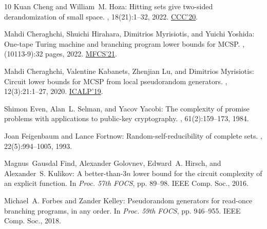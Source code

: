 \documentclass[11pt]{article}
\numberwithin{equation}{section}
\theoremstyle{definition}
\theoremstyle{plain}
\begin{document}
\begin{thebibliography}{10}
{\sc Kuan Cheng and William~M. Hoza}: Hitting sets give two-sided
  derandomization of small space.
, 18(21):1--32, 2022.
\newblock \prelim \href{https://doi.org/10.4230/LIPIcs.CCC.2020.10}{CCC'20}.

{\sc Mahdi Cheraghchi, Shuichi Hirahara, Dimitrios Myrisiotis, and Yuichi
  Yoshida}: One-tape {T}uring machine and branching program lower bounds for
  {MCSP}.
, (10113-9):32 pages, 2022.
\newblock \prelim \href{https://doi.org/10.4230/LIPIcs.STACS.2021.23}{MFCS'21}.
\newblock [\epfmtdoi{10.1007/s00224-022-10113-9}]

{\sc Mahdi Cheraghchi, Valentine Kabanets, Zhenjian Lu, and Dimitrios
  Myrisiotis}: Circuit lower bounds for {MCSP} from local pseudorandom
  generators.
, 12(3):21:1--27, 2020.
\newblock \prelim
  \href{https://doi.org/10.4230/LIPIcs.ICALP.2019.39}{ICALP'19}.
\newblock [\epfmtdoi{10.1145/3404860}]

{\sc Shimon Even, Alan~L. Selman, and Yacov Yacobi}: The complexity of promise
  problems with applications to public-key cryptography.
, 61(2):159--173, 1984.
\newblock [\epfmtdoi{10.1016/S0019-9958(84)80056-X}]

{\sc Joan Feigenbaum and Lance Fortnow}: Random-self-reducibility of complete
  sets.
, 22(5):994--1005, 1993.
\newblock [\epfmtdoi{10.1137/0222061}]

{\sc Magnus~Gausdal Find, Alexander Golovnev, Edward~A. Hirsch, and
  Alexander~S. Kulikov}: A better-than-$3n$ lower bound for the circuit
  complexity of an explicit function.
\newblock In {\em Proc. 57th FOCS}, pp. 89--98. IEEE Comp. Soc., 2016.

{\sc Michael~A. Forbes and Zander Kelley}: Pseudorandom generators for
  read-once branching programs, in any order.
\newblock In {\em Proc. 59th FOCS}, pp. 946--955. IEEE Comp. Soc., 2018.


\end{thebibliography}
\end{document}
